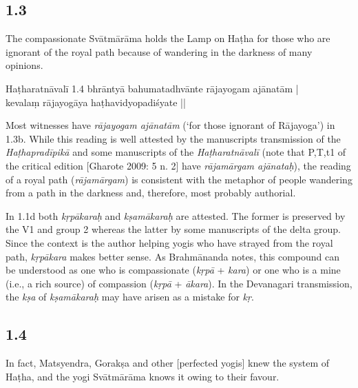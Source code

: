 \begin{ekdosis}
\subsection*{1.3}
\begin{translation}[hp01_003]
The compassionate Svātmārāma holds the Lamp on Haṭha for those who are ignorant of the royal path because of wandering in the darkness of many opinions.
\end{translation}

\begin{testimonia}[hp01_003]
Haṭharatnāvalī 1.4
\startverse
bhrāntyā bahumatadhvānte rājayogam ajānatām |\\
kevalaṃ rājayogāya haṭhavidyopadiśyate || 
\endverse
\end{testimonia}

\begin{philcomm}[hp01_003] 
Most witnesses have \emph{rājayogam ajānatām} (`for those ignorant of Rājayoga') in 1.3b. While this reading is well attested by the manuscripts transmission of the \emph{Haṭhapradīpikā} and some manuscripts of the \emph{Haṭharatnāvalī} (note that P,T,t1 of the critical edition [Gharote 2009: 5 n. 2] have \emph{rājamārgam ajānataḥ}), the reading of a royal path (\emph{rājamārgam}) is consistent with the metaphor of people wandering from a path in the darkness and, therefore, most probably authorial. 

In 1.1d both \emph{kṛpākaraḥ} and \emph{kṣamākaraḥ} are attested. The former is preserved by the V1 and group 2 whereas the latter by some manuscripts of the delta group. Since the context is the author helping yogis who have strayed from the royal path, \emph{kṛpākara} makes better sense. As Brahmānanda notes, this compound can be understood as one who is compassionate (\emph{kṛpā} + \emph{kara}) or one who is a mine (i.e., a rich source) of compassion (\emph{kṛpā} + \emph{ākara}). In the Devanagari transmission, the \emph{kṣa} of \emph{kṣamākaraḥ} may have arisen as a mistake for \emph{kṛ}.       
\end{philcomm}

\subsection*{1.4}
\begin{translation}[hp01_004]
In fact, Matsyendra, Gorakṣa and other [perfected yogis] knew the system of Haṭha, and the yogi Svātmārāma knows it owing to their favour.
\end{translation}


\end{ekdosis}
